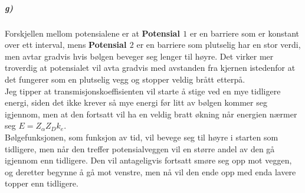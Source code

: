 \documentclass[11pt, A4paper,norsk]{article}
\begin{document}
			\subparagraph{g)}
				\begin{flushleft}
Forskjellen mellom potensialene er at \textbf{Potensial $1$} er en barriere som er konstant over ett interval, mens \textbf{Potensial $2$} er en barriere som plutselig har en stor verdi, men avtar gradvis hvis bølgen beveger seg lenger til høyre. Det virker mer troverdig at potensialet vil avta gradvis med avstanden fra kjernen istedenfor at det fungerer som en plutselig vegg og stopper veldig brått etterpå. \\
Jeg tipper at transmisjonskoeffisienten vil starte å stige ved en mye tidligere energi, siden det ikke krever så mye energi før litt av bølgen kommer seg igjennom, men at den fortsatt vil ha en veldig bratt økning når energien nærmer seg $E = Z_{\alpha} Z_{D} k_{e}$. \\
Bølgefunksjonen, som funksjon av tid, vil bevege seg til høyre i starten som tidligere, men når den treffer potensialveggen vil en større andel av den gå igjennom enn tidligere. Den vil antageligvis fortsatt smøre seg opp mot veggen, og deretter begynne å gå mot venstre, men nå vil den ende opp med enda lavere topper enn tidligere.
				\end{flushleft}
\end{document}
